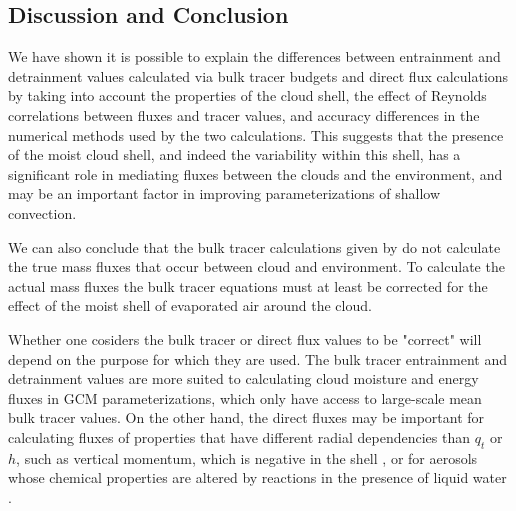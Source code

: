 \documentclass[draft,grl]{agutex}
\begin{document}
\begin{article}

\section{Discussion and Conclusion}

We have shown it is possible to explain the differences between entrainment and 
detrainment values calculated via bulk tracer budgets and direct flux 
calculations by taking into account the properties of the cloud shell, the 
effect of Reynolds correlations between fluxes and tracer values, and 
accuracy differences in the numerical methods used by the two calculations.
This suggests that the presence of the moist cloud shell, and indeed the 
variability within this shell, has a significant role in mediating fluxes 
between the clouds and the environment, and may be an important factor in 
improving parameterizations of shallow convection.

We can also conclude that the bulk tracer calculations given by 
\cite{Siebesma1995} do not calculate the true mass fluxes that occur between 
cloud and environment.  To calculate the actual mass fluxes the bulk tracer 
equations must at least be corrected for the effect of the moist shell of 
evaporated air around the cloud.

Whether one cosiders the bulk tracer or direct flux values to be "correct" will 
depend on the purpose for which they are used.  The bulk tracer entrainment and 
detrainment values are more suited to calculating cloud moisture and energy 
fluxes in GCM parameterizations, which only have access to large-scale mean 
bulk tracer values.  On the other hand, the direct fluxes may be important for 
calculating fluxes of properties that have different radial dependencies than 
$q_t$ or $h$, such as vertical momentum, which is negative in the shell 
\citep{Heus2008}, or for aerosols whose chemical properties are altered by 
reactions in the presence of liquid water \citep{Hoppel1994}.  



\end{article}
\end{document}
